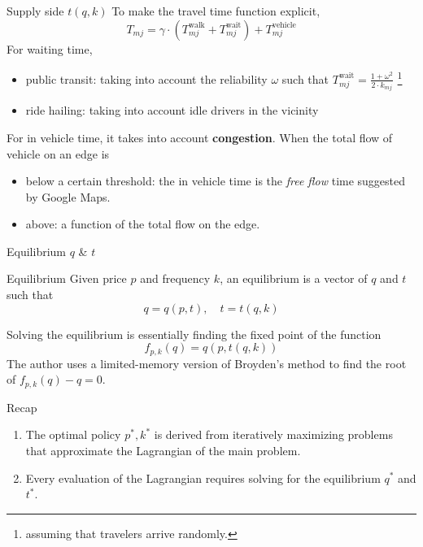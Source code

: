 \documentclass[10pt, aspectratio=169]{beamer}
\begin{document}
\begin{frame}{Supply side $t(q,k)$}
  To make the travel time function explicit,
  \begin{equation*}
    T_{mj} = \gamma \cdot \left( T_{mj}^{\text{walk}} + T_{mj}^{\text{wait}} \right) + T_{mj}^{\text{vehicle}}
  \end{equation*}
  For waiting time,
  \begin{itemize}
    \item public transit: taking into account the reliability $\omega$ such that
          $T_{mj}^{\text{wait}} = \frac{1 + \omega^2}{2 \cdot k_{mj}}$ \footnote{assuming
            that travelers arrive randomly.}
    \item ride hailing: taking into account idle drivers in the vicinity
  \end{itemize}
  For in vehicle time, it takes into account \textbf{congestion}. When the total flow of vehicle on an edge is
  \begin{itemize}
    \item  below a certain threshold: the in vehicle time is the \textit{free flow} time
          suggested by Google Maps.
    \item above: a function of the total flow on the edge.
  \end{itemize}
\end{frame}
\begin{frame}{Equilibrium $q$ \& $t$}
  \begin{block}{Equilibrium}
    Given price $p$ and frequency $k$, an equilibrium is a vector of $q$ and $t$
    such that
    \begin{equation*}
      q = q(p,t), \quad t = t(q,k)
    \end{equation*}
  \end{block}
  Solving the equilibrium is essentially finding the fixed point of the function
  \begin{equation*}
    f_{p,k}(q)=q(p,t(q,k))
  \end{equation*}
  The author uses a limited-memory version of Broyden's method to find the root of $f_{p,k}(q)-q=0$.
\end{frame}
\begin{frame}{Recap}
  \begin{enumerate}
    \item The optimal policy $p^*, k^*$ is derived from iteratively maximizing problems
          that approximate the Lagrangian of the main problem.
    \item Every evaluation of the Lagrangian requires solving for the equilibrium $q^*$
          and $t^*$.
  \end{enumerate}
\end{frame}
\end{document}
